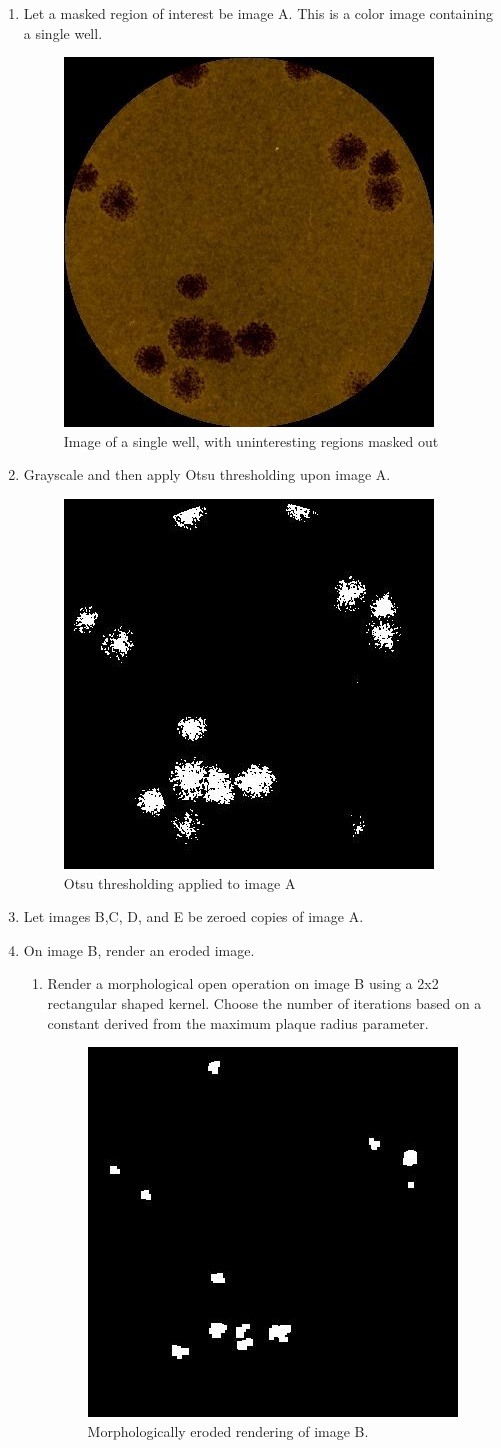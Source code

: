 \documentclass[11pt,final,twocolumn]{IEEEtran}
\begin{document}
\begin{enumerate}
\item Let a masked region of interest be image A. This is a color image containing a single well.
\begin{figure}[H]
\centering
\includegraphics[width=.25\textwidth]{countBegin.jpg}
\caption{Image of a single well, with uninteresting regions masked out}
\label{fig:countBegin}
\end{figure}


\item Grayscale and then apply Otsu thresholding upon image A.
\begin{figure}[H]
\centering
\includegraphics[width=.25\textwidth]{countOtsuA.jpg}
\caption{Otsu thresholding applied to image A}
\label{fig:countOtsuA}
\end{figure}

\item Let images B,C, D, and E be zeroed copies of image A.
\item On image B, render an eroded image.
\begin{enumerate}
\item
Render a morphological open \cite{morphological} operation on image B using a 2x2  rectangular shaped kernel. Choose the number of iterations based on a constant derived from the maximum plaque radius parameter.
\begin{figure}[H]
\centering
\includegraphics[width=.25\textwidth]{countErodeB.jpg}
\caption{Morphologically eroded rendering of image B.}
\label{fig:countErodeB}
\end{figure}
\end{enumerate}


\end{enumerate}
\end{document}
